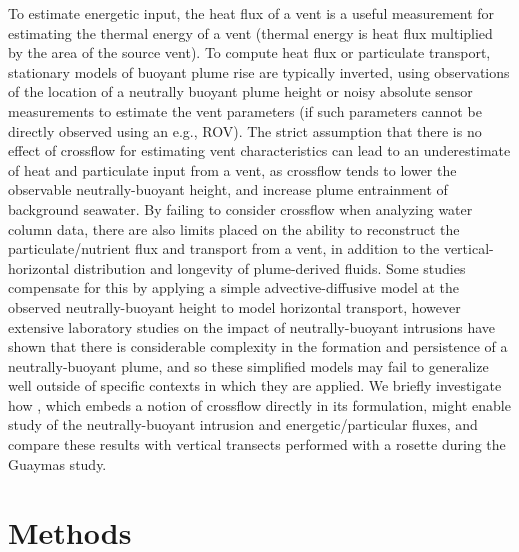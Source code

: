 To estimate energetic input, the heat flux of a vent is a useful measurement for estimating the thermal energy of a vent (thermal energy is heat flux multiplied by the area of the source vent). To compute heat flux or particulate transport, stationary models of buoyant plume rise are typically inverted, using observations of the location of a neutrally buoyant plume height or noisy absolute sensor measurements to estimate the vent parameters (if such parameters cannot be directly observed using an e.g., ROV)\autocite{barreyre2012structure,barreyre2011dispersal,wilson1996hydrothermal,mittelstaedt2012quantifying,baker1993method,ramondenc2006first,murch2020volcaniclastic}. The strict assumption that there is no effect of crossflow for estimating vent characteristics can lead to an underestimate of heat and particulate input from a vent, as crossflow tends to lower the observable neutrally-buoyant height, and increase plume entrainment of background seawater\autocite{tohidi2016highly,adams2020turbulence}. By failing to consider crossflow when analyzing water column data, there are also limits placed on the ability to reconstruct the particulate/nutrient flux and transport from a vent, in addition to the vertical-horizontal distribution and longevity of plume-derived fluids. Some studies compensate for this by applying a simple advective-diffusive model at the observed neutrally-buoyant height to model horizontal transport\autocite{barreyre2011dispersal,murch2020volcaniclastic}, however extensive laboratory studies on the impact of neutrally-buoyant intrusions\autocite{richards2014radial} have shown that there is considerable complexity in the formation and persistence of a neutrally-buoyant plume, and so these simplified models may fail to generalize well outside of specific contexts in which they are applied. We briefly investigate how \PHUMES, which embeds a notion of crossflow directly in its formulation, might enable study of the neutrally-buoyant intrusion and energetic/particular fluxes, and compare these results with vertical transects performed with a rosette during the Guaymas study. 


\section{Methods}
\label{sec:field_methods}

